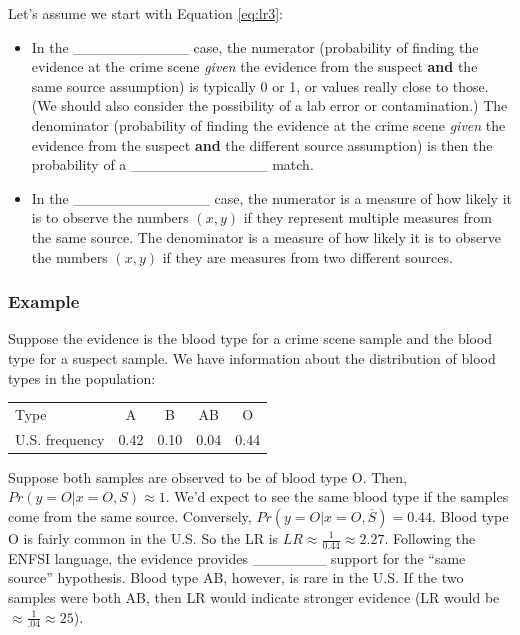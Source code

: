 \documentclass[]{book}
\providecommand{\tightlist}{%
  \setlength{\itemsep}{0pt}\setlength{\parskip}{0pt}}
\theoremstyle{definition}
\theoremstyle{definition}
\theoremstyle{remark}
\begin{document}
Let's assume we start with Equation \ref{eq:lr3}:

\begin{itemize}
\tightlist
\item
  In the \_\_\_\_\_\_\_\_\_\_\_ case, the numerator (probability of
  finding the evidence at the crime scene \emph{given} the evidence from
  the suspect \textbf{and} the same source assumption) is typically 0 or
  1, or values really close to those. (We should also consider the
  possibility of a lab error or contamination.) The denominator
  (probability of finding the evidence at the crime scene \emph{given}
  the evidence from the suspect \textbf{and} the different source
  assumption) is then the probability of a \_\_\_\_\_\_\_\_\_\_\_\_\_
  match. \vspace{.1in}
\item
  In the \_\_\_\_\_\_\_\_\_\_\_\_\_ case, the numerator is a measure of
  how likely it is to observe the numbers \((x,y)\) if they represent
  multiple measures from the same source. The denominator is a measure
  of how likely it is to observe the numbers \((x,y)\) if they are
  measures from two different sources.
\end{itemize}

\subsubsection{Example}\label{example-3}

Suppose the evidence is the blood type for a crime scene sample and the
blood type for a suspect sample. We have information about the
distribution of blood types in the population:

\begin{tabular}{l|cccc}
Type & A & B & AB & O \\
U.S. frequency & 0.42 & 0.10 & 0.04 & 0.44
\end{tabular}

Suppose both samples are observed to be of blood type O. Then,
\(Pr(y = O|x = O,S) \approx 1\). We'd expect to see the same blood type
if the samples come from the same source. Conversely,
\(Pr(y = O|x = O,\overline{S}) = 0.44\). Blood type O is fairly common
in the U.S. So the LR is \(LR \approx \frac{1}{0.44} \approx 2.27\).
Following the ENFSI language, the evidence provides \_\_\_\_\_\_\_
support for the ``same source'' hypothesis. Blood type AB, however, is
rare in the U.S. If the two samples were both AB, then LR would indicate
stronger evidence (LR would be \(\approx \frac{1}{.04} \approx 25\)).
\end{document}

